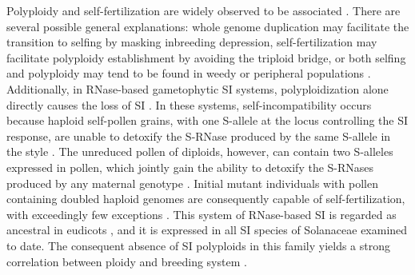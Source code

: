 Polyploidy and self-fertilization are widely observed to be associated \citep{stebbins1950}.
There are several possible general explanations: whole genome duplication may facilitate the transition to selfing by masking inbreeding depression, self-fertilization may facilitate polyploidy establishment by avoiding the triploid bridge, or both selfing and polyploidy may tend to be found in weedy or peripheral populations \citep{ramsey_1998, barringer2007, barrett2008, husband2008}.
Additionally, in RNase-based gametophytic SI systems, polyploidization alone directly causes the loss of SI \citep{stout1942, lewis1947}. %
In these systems, self-incompatibility occurs because haploid self-pollen grains, with one S-allele at the locus controlling the SI response, are unable to detoxify the S-RNase produced by the same S-allele in the style \citep{kubo2010}.
The unreduced pollen of diploids, however, can contain two S-alleles expressed in pollen, which jointly gain the ability to detoxify the S-RNases produced by any maternal genotype \citep{entani1999, tsukamoto2005, kubo2010}.
Initial mutant individuals with pollen containing doubled haploid genomes are consequently capable of self-fertilization, with exceedingly few exceptions \citep{hauck_2002, nunes_2006}.
This system of RNase-based SI is regarded as ancestral in eudicots \citep{igic_2001,steinbachs_2002}, and it is expressed in all SI species of Solanaceae examined to date.
The consequent absence of SI polyploids in this family yields a strong correlation between ploidy and breeding system \citep{robertson_2011}.

